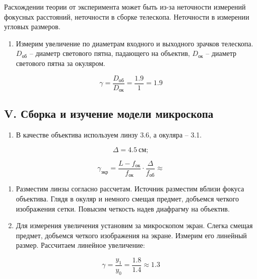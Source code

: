 \documentclass[a4paper,12pt]{article}
\begin{document}
Расхождении теории от эксперимента может быть из-за неточности измерений фокусных расстояний, неточности в сборке телескопа. Неточности в измерении угловых размеров.

\begin{enumerate}[resume]
    \item Измерим увеличение по диаметрам входного и выходного зрачков телескопа. $D_\text{об}$ -- диаметр светового пятна, падающего на объектив, $D_\text{ок}$ -- диаметр светового пятна за окуляром.
\end{enumerate}

\begin{equation*}
    \gamma = \frac{D_\text{об}}{D_\text{ок}} = \frac{1.9}{1} = 1.9
\end{equation*}


\subsection*{V. Сборка и изучение модели микроскопа}

\begin{enumerate}
    \item В качестве объектива используем линзу 3.6, а окуляра -- 3.1.
\end{enumerate}

\begin{equation*}
    \Delta = 4.5 \ \text{см}; 
\end{equation*}

\begin{equation*}
    \gamma_\text{экр} = \frac{L - f_\text{ок}}{f_\text{ок}} \cdot \frac{\Delta}{f_\text{об}} \approx 
\end{equation*}

\begin{enumerate}[resume]
    \item Разместим линзы согласно рассчетам. Источник разместим вблизи фокуса объектива. Глядя в окуляр и немного смещая предмет, добъемся четкого изображения сетки. Повысим четкость надев диафрагму на объектив.
    \item Для измерения увеличения установим за микроскопом экран. Слегка смещая предмет, добъемся четкого изображения на экране. Измерим его линейный размер. Рассчитаем линейное увеличение:
\end{enumerate}

\begin{equation*}
    \gamma = \frac{y_1}{y_0} = \frac{1.8}{1.4} \approx 1.3
\end{equation*}
\end{document}
